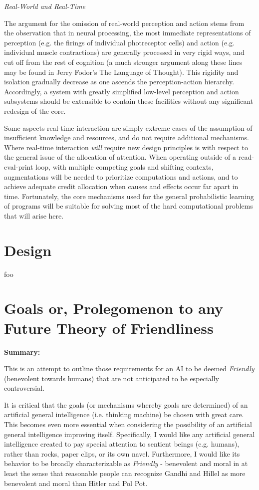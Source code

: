 \documentclass[twoside,11pt]{article}
\begin{document}
\emph{Real-World and Real-Time}

The argument for the omission of real-world perception and action stems from
the observation that in neural processing, the most immediate representations
of perception (e.g. the firings of individual photreceptor cells) and action
(e.g. individual muscle contractions) are generally processed in very rigid
ways, and cut off from the rest of cognition (a much stronger argument along
these lines may be found in Jerry Fodor's The Language of Thought). This
rigidity and isolation gradually decrease as one ascends the perception-action
hierarchy. Accordingly, a system with greatly simplified low-level perception
and action subsystems should be extensible to contain these facilities without
any significant redesign of the core.

Some aspects real-time interaction are simply extreme cases of the assumption
of insufficient knowledge and resources, and do not require additional
mechanisms. Where real-time interaction \emph{will} require new design
principles is with respect to the general issue of the allocation of
attention. When operating outside of a read-eval-print loop, with multiple
competing goals and shifting contexts, augmentations will be needed to
prioritize computations and actions, and to achieve adequate credit allocation
when causes and effects occur far apart in time. Fortunately, the core
mechanisms used for the general probabilistic learning of programs will be
suitable for solving most of the hard computational problems that will arise
here.

\section{Design}

foo~\cite{Solomonoff}

\section{Goals or, Prolegomenon to any Future Theory of Friendliness}

 \textbf{Summary:}

This is an attempt to outline those requirements for an AI to be deemed
\emph{Friendly} (benevolent towards humans) that are not anticipated to be
especially controversial.

It is critical that the goals (or mechanisms whereby goals are determined) of
an artificial general intelligence (i.e. thinking machine) be chosen with great
care. This becomes even more essential when considering the possibility of an
artificial general intelligence improving itself. Specifically, I would like
any artificial general intelligence created to pay special attention to
sentient beings (e.g. humans), rather than rocks, paper clips, or its own
navel. Furthermore, I would like its behavior to be broadly characterizable as
\emph{Friendly} - benevolent and moral in at least the sense that reasonable
people can recognize Gandhi and Hillel as more benevolent and moral than Hitler
and Pol Pot.
\end{document}
